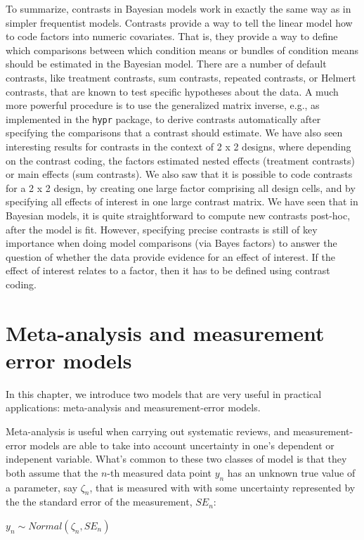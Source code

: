 \documentclass[12pt,]{krantz}
\theoremstyle{definition}
\theoremstyle{definition}
\theoremstyle{definition}
\theoremstyle{remark}
\begin{document}
To summarize, contrasts in Bayesian models work in exactly the same way
as in simpler frequentist models. Contrasts provide a way to tell the
linear model how to code factors into numeric covariates. That is, they
provide a way to define which comparisons between which condition means
or bundles of condition means should be estimated in the Bayesian model.
There are a number of default contrasts, like treatment contrasts, sum
contrasts, repeated contrasts, or Helmert contrasts, that are known to
test specific hypotheses about the data. A much more powerful procedure
is to use the generalized matrix inverse, e.g., as implemented in the
\texttt{hypr} package, to derive contrasts automatically after
specifying the comparisons that a contrast should estimate. We have also
seen interesting results for contrasts in the context of 2 x 2 designs,
where depending on the contrast coding, the factors estimated nested
effects (treatment contrasts) or main effects (sum contrasts). We also
saw that it is possible to code contrasts for a 2 x 2 design, by
creating one large factor comprising all design cells, and by specifying
all effects of interest in one large contrast matrix. We have seen that
in Bayesian models, it is quite straightforward to compute new contrasts
post-hoc, after the model is fit. However, specifying precise contrasts
is still of key importance when doing model comparisons (via Bayes
factors) to answer the question of whether the data provide evidence for
an effect of interest. If the effect of interest relates to a factor,
then it has to be defined using contrast coding.

\chapter{Meta-analysis and measurement error models}\label{ch:remame}

In this chapter, we introduce two models that are very useful in
practical applications: meta-analysis and measurement-error models.

Meta-analysis is useful when carrying out systematic reviews, and
measurement-error models are able to take into account uncertainty in
one's dependent or indepenent variable. What's common to these two
classes of model is that they both assume that the \(n\)-th measured
data point \(y_n\) has an unknown true value of a parameter, say
\(\zeta_n\), that is measured with with some uncertainty represented by
the the standard error of the measurement, \(SE_n\):

\(y_n \sim Normal(\zeta_n,SE_n)\)
\end{document}
